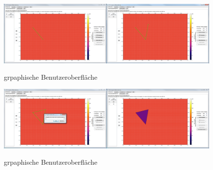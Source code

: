 \begin{figure}[H]
\centering
\includegraphics[scale=.25]{Benutzerdokumentation/GebietHinzufuegen2.png}\\
\caption{grpaphische Benutzeroberfläche}
\label{grpaphische Benutzeroberfläche}
\end{figure}

\begin{figure}[H]
\centering
\includegraphics[scale=.25]{Benutzerdokumentation/GebietHinzufuegen3.png}\\
\caption{grpaphische Benutzeroberfläche}
\label{grpaphische Benutzeroberfläche}
\end{figure}